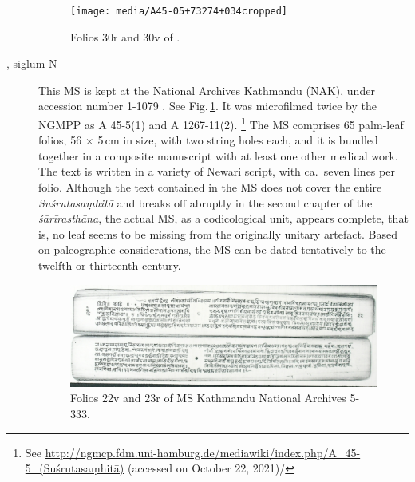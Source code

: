 \begin{description}
    
    
    \begin{figure}[t]
        \centering
        \texttt{[image: media/A45-05+73274+034cropped]}
        \caption{Folios 30r and 30v of .}
        \label{fig:a45-0573274044}
    \end{figure}
    
    \item[\MS{Kathmandu NAK 1-1079}, siglum N] This MS is kept at the National
    Archives Kathmandu (NAK), under accession number 1-1079 . See
    Fig.\,\ref{fig:a45-0573274044}. It was microfilmed twice by the NGMPP as A
    45-5(1) and A 1267-11(2).%
    \footnote{%
    See 
    \url{http://ngmcp.fdm.uni-hamburg.de/mediawiki/index.php/A_45-5_(Suśrutasaṃhitā)} 
    (accessed on October 22, 2021)/ } The MS comprises 65 palm-leaf folios, 56 $\times$ 
    5\,cm in size, with two string holes each, and it is bundled together in a composite 
    manuscript with at least one other medical work. The text is written in a variety of 
    Newari script, with ca.\ seven lines per folio. Although the text contained in the MS 
    does not cover the entire \emph{Suśrutasaṃhitā} and breaks off abruptly in the 
    second chapter of the \emph{śārīrasthāna}, the actual MS, as a codicological unit, 
    appears complete, that is, no leaf seems to be missing from the originally unitary 
    artefact. Based on paleographic considerations, the MS can be dated tentatively to 
    the twelfth or thirteenth century.
    
    \begin{figure}[t]
        \centering
        \includegraphics[draft=false,width=1\linewidth]{"media/dscn2998 fol 022cropped"}
        \caption{Folios 22v and 23r of MS Kathmandu National Archives 5-333.}
        \label{fig:dscn2998-fol-022cropped}
    \end{figure}
    

\end{description}
